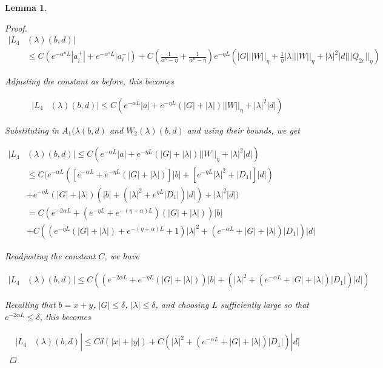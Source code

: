 \documentclass[12pt]{article}
\newtheorem{lemma}{Lemma}
\begin{document}
\begin{lemma}
\begin{proof}
\begin{align*}
|L_4&(\lambda)(b,d)| \\
&\leq C\left( e^{-\alpha^u L}|a_i^+| +  e^{-\alpha^s L}|a_i^-|
\right) + C \left( \frac{1}{\alpha^s - \eta} + \frac{1}{\alpha^u - \eta} \right) e^{-\eta L} 
\left( |G| ||W||_\eta + \frac{1}{\eta} |\lambda| ||W||_\eta + |\lambda|^2 |d| ||Q_{2c}||_\eta \right)
\end{align*}

Adjusting the constant as before, this becomes

\begin{align*}
|L_4&(\lambda)(b,d)| \leq C\left( e^{-\alpha L}|a|
+ e^{-\eta L} 
\left( |G| + |\lambda| \right) ||W||_\eta + |\lambda|^2 |d| \right)
\end{align*}

Substituting in $A_1(\lambda(b,d)$ and $W_2(\lambda)(b,d)$ and using their bounds, we get

\begin{align*}
|L_4&(\lambda)(b,d)| \leq C\left( e^{-\alpha L}|a|
+ e^{-\eta L} \left( |G| + |\lambda| \right) ||W||_\eta + |\lambda|^2 |d| \right)\\
&\leq C( e^{-\alpha L}\left( \left[e^{-\alpha L} + e^{-\eta L} \left(|G| + |\lambda|\right) \right]|b| + \left[ e^{-\eta L} |\lambda|^2 + |D_1| \right] |d| \right) \\
&+ e^{-\eta L} \left( |G| + |\lambda| \right) \left( |b| + \left( |\lambda|^2 + e^{\eta L}|D_1| \right) |d|\right) + |\lambda|^2 |d| ) \\
&= C(e^{-2 \alpha L} + (e^{-\eta L} + e^{-(\eta + \alpha)L})(|G| + |\lambda|))|b| \\
&+ C((e^{-\eta L}(|G| + |\lambda|) + e^{-(\eta + \alpha)L} + 1)|\lambda|^2 + (e^{-\alpha L} + |G| + |\lambda|)|D_1| )|d|
\end{align*}

Readjusting the constant $C$, we have


\begin{align*}
|L_4&(\lambda)(b,d)| \leq
C\left( (e^{-2 \alpha L} + e^{-\eta L}(|G| + |\lambda|))|b| 
+ (|\lambda|^2 + (e^{-\alpha L} + |G| + |\lambda|)|D_1| )|d| \right)
\end{align*}

Recalling that $b = x + y$, $|G| \leq \delta$, $|\lambda| \leq \delta$, and choosing $L$ sufficiently large so that $e^{-2 \alpha L} \leq \delta$, this becomes

\begin{align*}
|L_4&(\lambda)(b,d)| \leq C\delta(|x| + |y|) + C(|\lambda|^2 + (e^{-\alpha L} + |G| + |\lambda|)|D_1| )|d|
\end{align*}


\end{proof}
\end{lemma}
\end{document}
